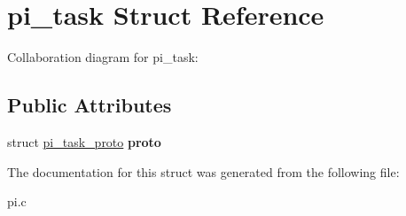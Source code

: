 \hypertarget{structpi__task}{}\section{pi\+\_\+task Struct Reference}
\label{structpi__task}


Collaboration diagram for pi\+\_\+task\+:
\subsection*{Public Attributes}
\begin{DoxyCompactItemize}
\item 
\mbox{\label{structpi__task_a2fdd4e91e16cc85a2a7d2ba133f871a0}} 
struct \hyperlink{structpi__task__proto}{pi\+\_\+task\+\_\+proto} {\bfseries proto}
\end{DoxyCompactItemize}


The documentation for this struct was generated from the following file\+:\begin{DoxyCompactItemize}
\item 
pi.\+c\end{DoxyCompactItemize}
